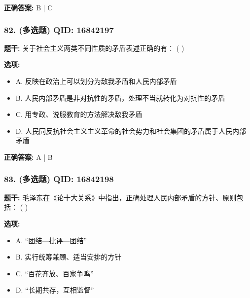 \documentclass[12pt,UTF8]{ctexart}
\begin{document}
\textbf{正确答案:}
B | C

\vspace{0.3em}\hrulefill\vspace{0.7em}

\subsubsection*{82. (多选题) \small QID: 16842197}

\textbf{题干:}
关于社会主义两类不同性质的矛盾表述正确的有： ( )

\textbf{选项:}
\begin{itemize}[leftmargin=*]

  \item A. 反映在政治上可以划分为敌我矛盾和人民内部矛盾

  \item B. 人民内部矛盾是非对抗性的矛盾，处理不当就转化为对抗性的矛盾

  \item C. 用专政、说服教育的方法解决敌我矛盾

  \item D. 人民同反抗社会主义主义革命的社会势力和社会集团的矛盾属于人民内部矛盾

\end{itemize}

\textbf{正确答案:}
A | B

\vspace{0.3em}\hrulefill\vspace{0.7em}

\subsubsection*{83. (多选题) \small QID: 16842198}

\textbf{题干:}
毛泽东在《论十大关系》中指出，正确处理人民内部矛盾的方针、原则包括： ( )

\textbf{选项:}
\begin{itemize}[leftmargin=*]

  \item A. “团结—批评—团结”

  \item B. 实行统筹兼顾、适当安排的方针

  \item C. “百花齐放、百家争鸣”

  \item D. “长期共存，互相监督”

\end{itemize}
\end{document}
